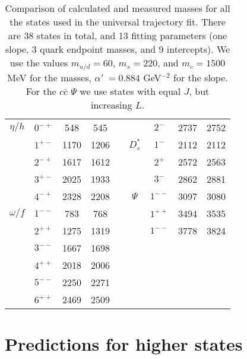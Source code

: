 \documentclass[11pt,a4]{article}
\newcommand{\alp}{\ensuremath{\alpha'\:}}
\begin{document}
\begin{table}[tpb]
\begin{tabular}{|c|c|c|c|c|c|c|c|c|}
		\(\eta/h\)& \(0^{-+}\) & 548  & 545  &				            &	& \(2^-\)    & 2737 & 2752 \\ \cline{6-9}

							& \(1^{+-}\) & 1170 & 1206 &				  &	\(D^*_s\) & \(1^-\)    & 2112 & 2112 \\

							& \(2^{-+}\) & 1617 & 1612 &				            &	& \(2^+\)    & 2572 & 2563 \\

							& \(3^{+-}\) & 2025 & 1933 &				            &	& \(3^-\)    & 2862 & 2881 \\ \cline{6-9}

							& \(4^{-+}\) & 2328 & 2208 &					 &	\(\Psi\)& \(1^{--}\) & 3097 & 3080 \\ \cline{1-4}

		\(\omega/f\)&\(1^{--}\)& 783  & 768  &				            &	& \(1^{++}\) & 3494 & 3535 \\

							& \(2^{++}\) & 1275 & 1319 &				            &	& \(1^{--}\) & 3778 & 3824 \\ \cline{6-9}

							& \(3^{--}\) & 1667 & 1698 &				            &	& & & \\

							& \(4^{++}\) & 2018 & 2006 &				            &	& & & \\

							& \(5^{--}\) & 2250 & 2271 &				            &	& & & \\

							& \(6^{++}\) & 2469 & 2509 &				            &	& & & \\ \hline

	\end{tabular}

	\caption{\label{tab:universal_masses} Comparison of calculated and measured masses for all the states used in the universal trajectory fit. There are 38 states in total, and 13 fitting parameters (one slope, 3 quark endpoint masses, and 9 intercepts). We use the values \(m_{u/d} = 60\), \(m_s = 220\), and \(m_c = 1500\) MeV for the masses, \(\alp = 0.884\) GeV\(^{-2}\) for the slope. For the \(c\bar{c}\) \(\Psi\) we use states with equal \(J\), but increasing \(L\).}

\end{table}



\section{Predictions for higher states}
\end{document}

